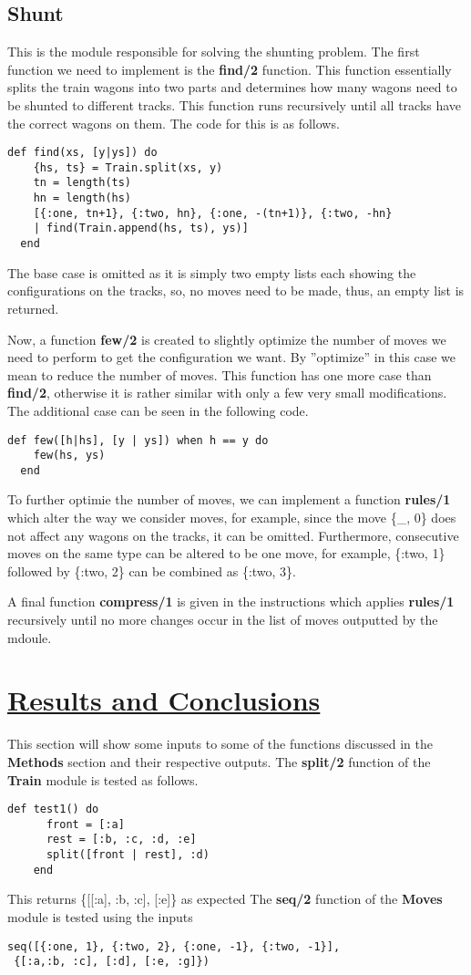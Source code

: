 \documentclass[a4paper,11pt]{article}
\begin{document}
\subsection*{
	\textbf{Shunt}
	}
This is the module responsible for solving the shunting problem. The first function we need to implement is the \textbf{find/2} function. This function essentially splits the train wagons into two parts and determines how many wagons need to be shunted to different tracks. This function runs recursively until all tracks have the correct wagons on them. The code for this is as follows.
\begin{verbatim}
def find(xs, [y|ys]) do
    {hs, ts} = Train.split(xs, y)
    tn = length(ts)
    hn = length(hs)
    [{:one, tn+1}, {:two, hn}, {:one, -(tn+1)}, {:two, -hn} 
    | find(Train.append(hs, ts), ys)]
  end
\end{verbatim}
The base case is omitted as it is simply two empty lists each showing the configurations on the tracks, so, no moves need to be made, thus, an empty list is returned.

Now, a function \textbf{few/2} is created to slightly optimize the number of moves we need to perform to get the configuration we want. By ''optimize'' in this case we mean to reduce the number of moves. This function has one more case than \textbf{find/2}, otherwise it is rather similar with only a few very small modifications. The additional case can be seen in the following code.
\begin{verbatim}
def few([h|hs], [y | ys]) when h == y do
    few(hs, ys)
  end
  \end{verbatim}
  To further optimie the number of moves, we can implement a function \textbf{rules/1} which alter the way we consider moves, for example, since the move \{\_, 0\} does not affect any wagons on the tracks, it can be omitted. Furthermore, consecutive moves on the same type can be altered to be one move, for example, \{:two, 1\} followed by \{:two, 2\} can be combined as \{:two, 3\}.

A final function \textbf{compress/1} is given in the instructions which applies \textbf{rules/1} recursively until no more changes occur in the list of moves outputted by the mdoule.


\section*{
	\underline{Results and Conclusions}
	}
This section will show some inputs to some of the functions discussed in the \textbf{Methods} section and their respective outputs. 
The \textbf{split/2} function of the \textbf{Train} module is tested as follows.
\begin{verbatim}
def test1() do
      front = [:a]
      rest = [:b, :c, :d, :e]
      split([front | rest], :d)
    end
    \end{verbatim}
    This returns \{[[:a], :b, :c], [:e]\} as expected
The \textbf{seq/2} function of the \textbf{Moves} module is tested using the inputs 
\begin{verbatim}
seq([{:one, 1}, {:two, 2}, {:one, -1}, {:two, -1}],
 {[:a,:b, :c], [:d], [:e, :g]})
\end{verbatim} 
\end{document}
